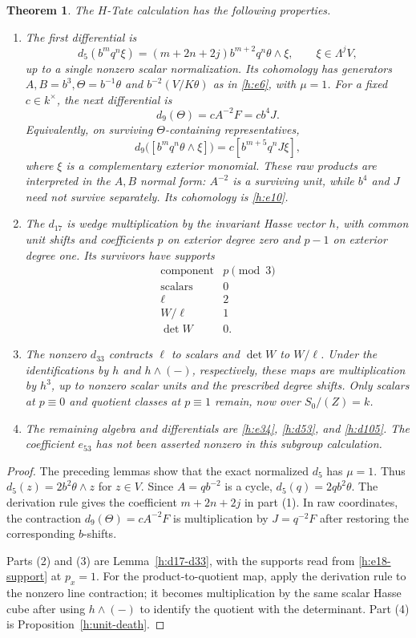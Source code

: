 \documentclass[11pt]{article}
\newtheorem{theorem}{Theorem}[section]
\theoremstyle{definition}
\theoremstyle{remark}
\numberwithin{equation}{section}
\begin{document}
\begin{theorem}
 \label{h:differentials}
 The $H$-Tate calculation has the following properties.
 \begin{enumerate}[label=(\arabic*)]
  \item The first differential is
  \[
  d_5(b^m q^n\xi)
    =(m+2n+2j)b^{m+2}q^n\theta\wedge\xi,
    \qquad \xi\in\Lambda^jV,
  \]
  up to a single nonzero scalar normalization. Its cohomology has
  generators $A,B=b^3,\Theta=b^{-1}\theta$ and
  $b^{-2}(V/K\theta)$ as in \eqref{h:e6}, with $\mu=1$.
  For a fixed $c\in k^{\times}$, the next differential is
  \[
   d_9(\Theta)=cA^{-2}F=cb^4J.
  \]
  Equivalently, on surviving $\Theta$-containing representatives,
  \[
   d_9\bigl([b^m q^n\theta\wedge\xi]\bigr)
     =c[b^{m+5}q^nJ\xi],
  \]
  where $\xi$ is a complementary exterior monomial. These raw
  products are interpreted in the $A,B$ normal form: $A^{-2}$ is
  a surviving unit, while $b^4$ and $J$ need not survive separately.
  Its cohomology is \eqref{h:e10}.
  \item The $d_{17}$ is wedge multiplication by the invariant Hasse
  vector $h$, with common unit shifts and coefficients $p$ on exterior
  degree zero and $p-1$ on exterior degree one. Its survivors have
  supports
  \[
  \begin{array}{c|c}
  \text{component}&p\pmod3\\\hline
  \text{scalars}&0\\
  \ell&2\\
  W/\ell&1\\
  \det W&0.
  \end{array}
  \]
  \item The nonzero $d_{33}$ contracts $\ell$ to scalars and
  $\det W$ to $W/\ell$. Under the identifications by $h$ and
  $h\wedge(-)$, respectively, these maps are multiplication by
  $h^3$, up to nonzero scalar units and the prescribed degree shifts.
  Only scalars at $p\equiv0$ and quotient classes at $p\equiv1$
  remain, now over $S_0/(Z)=k$.
  \item The remaining algebra and differentials are
  \eqref{h:e34}, \eqref{h:d53}, and \eqref{h:d105}. The coefficient
  $e_{53}$ has not been asserted nonzero in this subgroup calculation.
 \end{enumerate}
\end{theorem}

\begin{proof}
The preceding lemmas show that the exact normalized $d_5$ has
$\mu=1$. Thus $d_5(z)=2b^2\theta\wedge z$ for $z\in V$.
Since $A=qb^{-2}$ is a cycle,
$d_5(q)=2qb^2\theta$. The derivation rule gives the coefficient
$m+2n+2j$ in part (1). In raw coordinates, the contraction
$d_9(\Theta)=cA^{-2}F$ is multiplication by $J=q^{-2}F$ after
restoring the corresponding $b$-shifts.

Parts (2) and (3) are Lemma~\ref{h:d17-d33}, with the supports
read from \eqref{h:e18-support} at $p_x=1$. For the product-to-quotient
map, apply the derivation rule to the nonzero line contraction; it
becomes multiplication by the same scalar Hasse cube after using
$h\wedge(-)$ to identify the quotient with the determinant. Part (4)
is Proposition~\ref{h:unit-death}.
\end{proof}
\end{document}
